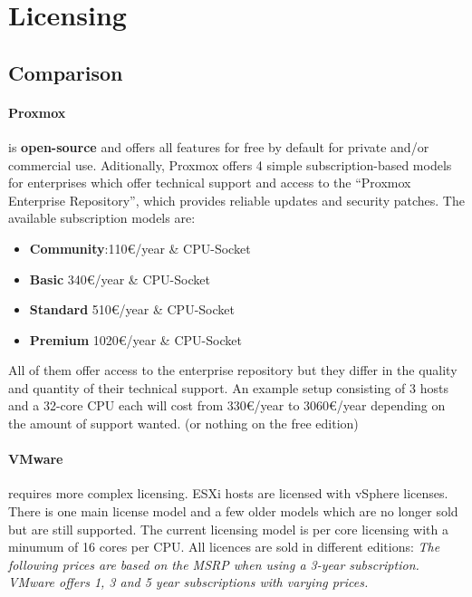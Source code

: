 
\section{Licensing}

\subsection{Comparison}

\paragraph{Proxmox} 
is \textbf{open-source} and offers all features for free by default for private and/or commercial use. Aditionally, Proxmox offers 4 simple subscription-based models for enterprises which offer technical support and access to the \enquote{Proxmox Enterprise Repository}, which provides reliable updates and security patches. The available subscription models are:
\begin{itemize}
	\item \textbf{Community}:\num{ 110}€/year \& CPU-Socket
	\item \textbf{Basic} \num{340}€/year \& CPU-Socket
	\item \textbf{Standard} \num{510}€/year \& CPU-Socket
	\item \textbf{Premium} \num{1020}€/year \& CPU-Socket
\end{itemize}
All of them offer access to the enterprise repository but they differ in the quality and quantity of their technical support.\newline
An example setup consisting of 3 hosts and a 32-core CPU each will cost from \num{330}€/year to \num{3060}€/year depending on the amount of support wanted. (or nothing on the free edition)


\paragraph{VMware} requires more complex licensing.\newline
ESXi hosts are licensed with vSphere licenses. There is one main license model and a few older models which are no longer sold but are still supported. The current licensing model is per core licensing with a minumum of 16 cores per CPU. All licences are sold in different editions:\newline 
\textit{The following prices are based on the MSRP when using a 3-year subscription. VMware offers 1, 3 and 5 year subscriptions with varying prices.}

